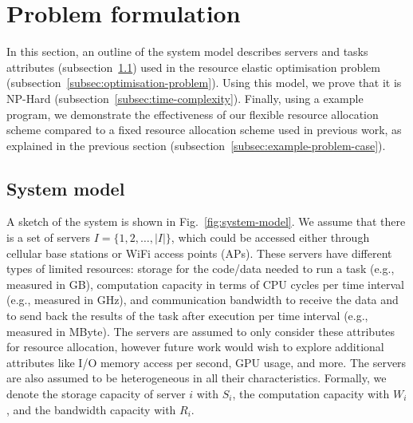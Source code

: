 \section{Problem formulation}
\label{sec:problem-formulation}
In this section, an outline of the system model describes servers and tasks attributes
(subsection~\ref{subsec:system-model}) used in the resource elastic optimisation problem
(subsection~\ref{subsec:optimisation-problem}). Using this model, we prove that it is NP-Hard
(subsection~\ref{subsec:time-complexity}). Finally, using a example program, we demonstrate the effectiveness of our
flexible resource allocation scheme compared to a fixed resource allocation scheme used in previous work, as explained
in the previous section (subsection~\ref{subsec:example-problem-case}).

\subsection{System model}
\label{subsec:system-model}
A sketch of the system is shown in Fig.~\ref{fig:system-model}.
We assume that there is a set of servers $I = \{1,2,\ldots,\left|I\right|\}$, which could be accessed either through
cellular base stations or WiFi access points (APs). These servers have different types of limited resources:
storage for the code/data needed to run a task (e.g., measured in GB), computation capacity in terms of CPU cycles per
time interval (e.g., measured in GHz), and communication bandwidth to receive the data and to send back the results
of the task after execution per time interval (e.g., measured in MByte). The servers are assumed to only consider these
attributes for resource allocation, however future work would wish to explore additional attributes like I/O memory
access per second, GPU usage, and more. The servers are also assumed to be heterogeneous in all their characteristics.
Formally, we denote the storage capacity of server $i$ with $S_i$, the computation capacity with $W_i$, and the
bandwidth capacity with $R_i$.


